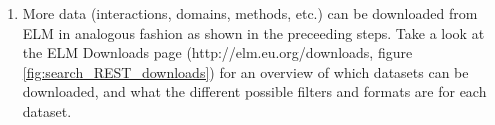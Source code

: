 \begin{enumerate}
\item More data (interactions, domains, methods, etc.) can be downloaded from
	ELM in analogous fashion as shown in the preceeding steps. Take a look
	at the ELM Downloads page (http://elm.eu.org/downloads, figure
	\ref{fig:search_REST_downloads}) for an overview of which datasets can
	be downloaded, and what the different possible filters and formats are
	for each dataset.  

\end{enumerate}
